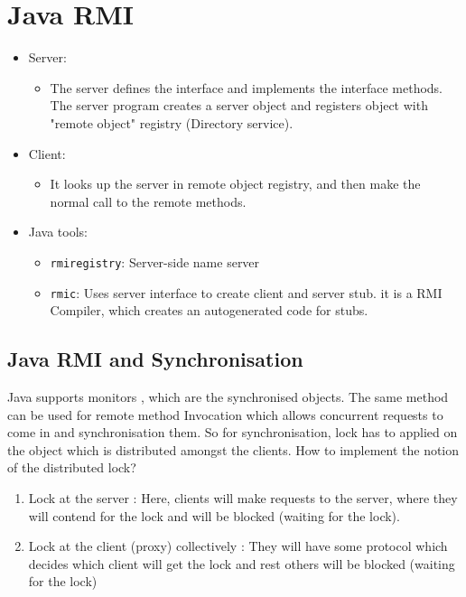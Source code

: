 \documentclass[twoside]{article}
\begin{document}
\section{Java RMI}

\begin{itemize}

	\item Server:
	\begin{itemize}
	\item The server defines the interface and implements the interface methods. The server program creates a server object and registers object with "remote object" registry (Directory service).
	\end{itemize}
	\item Client:
	\begin{itemize}
	\item It looks up the server in remote object registry, and then make the normal call to the remote methods.
	\end{itemize}
	\item Java tools:
		\begin{itemize}
		\item \texttt{rmiregistry}: Server-side name server
		\item \texttt{rmic}: Uses server interface to create client and server stub. it is a RMI Compiler, which creates an autogenerated code for stubs.
		\end{itemize}

\end{itemize}


\subsection{Java RMI and Synchronisation}
Java supports monitors , which are the synchronised objects. The same method can be used for remote method Invocation which allows concurrent requests to come in and synchronisation them. So for synchronisation, lock has to applied on the object which is distributed amongst the clients. How to implement the notion of the distributed lock? 
\begin{enumerate}
\item Lock at the server :  Here, clients will make requests to the server, where they will contend for the lock and will be blocked (waiting for the lock).
\item Lock at the client (proxy) collectively : They will have some protocol which decides which client will get the lock and rest others will be blocked (waiting for the lock)
\end{enumerate}
\end{document}
